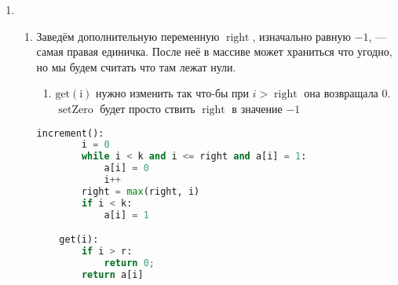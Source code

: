 \documentclass[a4paper, 10pt]{article}
\begin{document}
\begin{enumerate}
\item
\begin{enumerate}
	 время работы increment в худшем случае составит k операций\\
	Это значение достигается когда массив а заполнен единицами.\\

	 сколько раз мы инвертировали бит с номером i.\\
	Нулевой бит инвертируется каждую операцию, первый бит - каждую вторую.
	Нетрудно заметить что i бит меняет значение только после $2^{i}$ операций $\operatorname{increment}$.
	Итого получаем $n + \frac{n}{2} + \frac{n}{4} + ... \leq 2n$\\

	 массив в котором на $k-1$ месте стоит единица, а остальные значения - нули.\\
	Будем чередуя выполнять операции decrement и increment.\\
	Нетрудно заметить что каждая будет выполняться за k простых операций.\\
	Следовательно время работы в худшем случае --- $\mathcal{O}(nk)$.\\

	\item Заведём дополнительную переменную $\operatorname{right}$, изначально равную $-1$, --- самая правая единичка. После неё в массиве может храниться что угодно, но мы будем считать что там лежат нули.
	\begin{enumerate}
		 цикл в $\operatorname{increment}$ дойдет до $\operatorname{right} + 1$ мы должны остановиться так как помним о том что все элементы после $\operatorname{right}$ равны нулю. Ещё нужно подвинуть $\operatorname{right}$ в случае когда $i~>~\operatorname{right}$, потому что самая правая единичка может подвинуться правее.
		\item$\operatorname{get(i)}$ нужно изменить так что-бы при $i > \operatorname{right}$ она возвращала $0$.
		 $\operatorname{setZero}$ будет просто ствить   $\operatorname{right}$ в значение $-1$
	\end{enumerate}
	\begin{lstlisting}[language=Python]
	increment():
		i = 0
		while i < k and i <= right and a[i] = 1:
			a[i] = 0
			i++
		right = max(right, i)
		if i < k:
			a[i] = 1

	get(i):
		if i > r:
			return 0; 
		return a[i]


\end{lstlisting}
\end{enumerate}
\end{enumerate}
\end{document}
